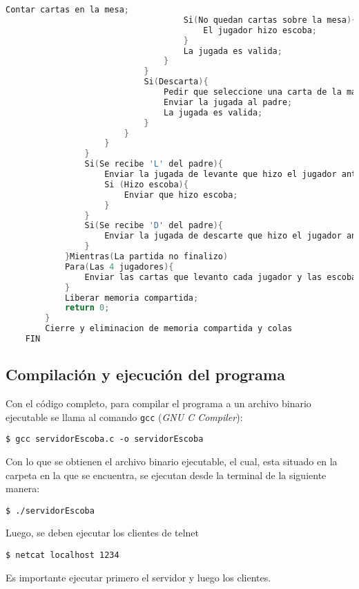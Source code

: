\begin{lstlisting}[language=C]
                                    Contar cartas en la mesa;
                                    Si(No quedan cartas sobre la mesa){
                                        El jugador hizo escoba;
                                    }
                                    La jugada es valida;
                                }
                            }
                            Si(Descarta){
                                Pedir que seleccione una carta de la mano para descartar;
                                Enviar la jugada al padre;
                                La jugada es valida;
                            }
                        }
                    }
                }
                Si(Se recibe 'L' del padre){
                    Enviar la jugada de levante que hizo el jugador anterior;
                    Si (Hizo escoba){
                        Enviar que hizo escoba;
                    }
                }
                Si(Se recibe 'D' del padre){
                    Enviar la jugada de descarte que hizo el jugador anterior;
                }
            }Mientras(La partida no finalizo)
            Para(Las 4 jugadores){
                Enviar las cartas que levanto cada jugador y las escobas;
            }
            Liberar memoria compartida;
            return 0;
        }
        Cierre y eliminacion de memoria compartida y colas
    FIN
\end{lstlisting}

\subsection{Compilación y ejecución del programa}

Con el código completo, para compilar el programa a un archivo binario ejecutable se llama al comando \texttt{gcc} (\textit{GNU C Compiler}):

\begin{center}
    \texttt{\$ gcc servidorEscoba.c -o servidorEscoba}\\
\end{center}

Con lo que se obtienen el archivo binario ejecutable, el cual, esta situado en la carpeta en la que se encuentra, se ejecutan desde la terminal de la siguiente manera:

\begin{center}
    \texttt{\$ ./servidorEscoba}\\
\end{center}

Luego, se deben ejecutar los clientes de telnet

\begin{center}
    \texttt{\$ netcat localhost 1234}\\
\end{center}

Es importante ejecutar primero el servidor y luego los clientes.